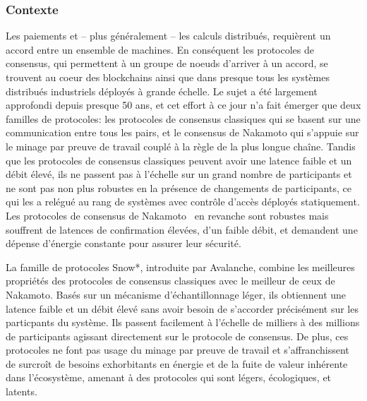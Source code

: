 \documentclass[runningheads]{llncs}
\begin{document}
\subsubsection{Contexte}
Les paiements et -- plus généralement -- les calculs distribués, requièrent un accord entre un ensemble de machines. En
conséquent les protocoles de consensus, qui permettent à un groupe de noeuds d'arriver à un accord, se trouvent au coeur
des blockchains ainsi que dans presque tous les systèmes distribués industriels déployés à grande échelle. Le sujet a
été largement approfondi depuis presque 50 ans, et cet effort à ce jour n'a fait émerger que deux familles de
protocoles: les protocoles de consensus classiques qui se basent sur une communication entre tous les pairs, et le
consensus de Nakamoto qui s'appuie sur le minage par preuve de travail couplé à la règle de la plus longue chaîne.
Tandis que les protocoles de consensus classiques peuvent avoir une latence faible et un débit élevé, ils ne passent
pas à l'échelle sur un grand nombre de participants et ne sont pas non plus robustes en la présence de changements de
participants, ce qui les a relégué au rang de systèmes avec contrôle d'accès déployés statiquement. Les protocoles de
consensus de Nakamoto~\cite{nakamoto2008bitcoin,wood2014ethereum,EyalGSR16} en revanche sont robustes mais souffrent
de latences de confirmation élevées, d'un faible débit, et demandent une dépense d'énergie constante pour assurer leur
sécurité.

La famille de protocoles Snow*, introduite par Avalanche, combine les meilleures propriétés des protocoles de consensus
classiques avec le meilleur de ceux de Nakamoto. Basés sur un mécanisme d'échantillonnage léger, ils obtiennent une
latence faible et un débit élevé sans avoir besoin de s'accorder précisément sur les particpants du système.
Ils passent facilement à l'échelle de milliers à des millions de participants agissant directement sur le protocole de
consensus. De plus, ces protocoles ne font pas usage du minage par preuve de travail et s'affranchissent de surcroît
de besoins exhorbitants en énergie et de la fuite de valeur inhérente dans l'écosystème, amenant à des protocoles qui
sont légers, écologiques, et latents.
\end{document}

